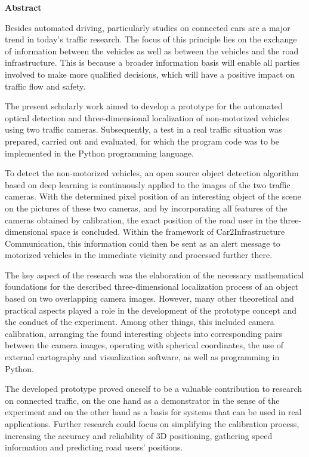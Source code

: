 \vfill

{\bfseries\LARGE Abstract}\\[25pt] 

\begin{small}
Besides automated driving, particularly studies on connected cars are a major trend in today's traffic research. The focus of this principle lies on the exchange of information between the vehicles as well as between the vehicles and the road infrastructure. This is because a broader information basis will enable all parties involved to make more qualified decisions, which will have a positive impact on traffic flow and safety.\kleinerabstand

\noindent The present scholarly work aimed to develop a prototype for the automated optical detection and three-dimensional localization of non-motorized vehicles using two traffic cameras. Subsequently, a test in a real traffic situation was prepared, carried out and evaluated, for which the program code was to be implemented in the Python programming language.\kleinerabstand

\noindent To detect the non-motorized vehicles, an open source object detection algorithm based on deep learning is continuously applied to the images of the two traffic cameras. With the determined pixel position of an interesting object of the scene on the pictures of these two cameras, and by incorporating all features of the cameras obtained by calibration, the exact position of the road user in the three-dimensional space is concluded. Within the framework of Car2Infrastructure Communication, this information could then be sent as an alert message to motorized vehicles in the immediate vicinity and processed further there.\kleinerabstand

\noindent The key aspect of the research was the elaboration of the necessary mathematical foundations for the described three-dimensional localization process of an object based on two overlapping camera images. However, many other theoretical and practical aspects played a role in the development of the prototype concept and the conduct of the experiment. Among other things, this included camera calibration, arranging the found interesting objects into corresponding pairs between the camera images, operating with spherical coordinates, the use of external cartography and visualization software, as well as programming in Python.\kleinerabstand

\noindent The developed prototype proved oneself to be a valuable contribution to research on connected traffic, on the one hand as a demonstrator in the sense of the experiment and on the other hand as a basis for systems that can be used in real applications. 
Further research could focus on simplifying the calibration process, increasing the accuracy and reliability of 3D positioning, gathering speed information and predicting road users' positions.\kleinerabstand
\end{small}

\vfill
